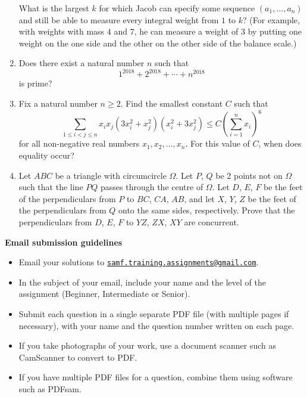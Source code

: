 \documentclass{article}
\begin{document}
\begin{enumerate}[1.]
What is the largest $k$ for which Jacob can specify some sequence $(a_1, \dotsc, a_n)$ and still be able to measure every integral weight from $1$ to $k$? (For example, with weights with mass $4$ and $7$, he can measure a weight of $3$ by putting one weight on the one side and the other on the other side of the balance scale.)


\vspace{6pt}
\item
Does there exist a natural number $n$ such that
\[
	1^{2018} + 2^{2018} + \cdots + n^{2018}
\]
is prime?


\vspace{6pt}
\item %
Fix a natural number $n \geq 2$. Find the smallest constant $C$ such that
\[
	 \sum_{1 \leq i < j \leq n} x_i x_j (3x_i^2 + x_j^2)(x_i^2 + 3x_j^2) \leq C {\left( \sum_{i = 1}^{n} x_i \right)}^6
\]
for all non-negative real numbers $x_1, x_2, \dots, x_n$. For this value of $C$, when does equality occur?


\item Let $ABC$ be a triangle with circumcircle $\Omega$. Let $P$, $Q$ be 2 points not on $\Omega$ such that the line $PQ$ passes through the centre of $\Omega$. Let $D$, $E$, $F$ be the feet of the perpendiculars from $P$ to $BC$, $CA$, $AB$, and let $X$, $Y$, $Z$ be the feet of the perpendiculars from $Q$ onto the same sides, respectively. Prove that the perpendiculars from $D$, $E$, $F$ to $YZ$, $ZX$, $XY$ are concurrent.

\end{enumerate}


\vfill
\textbf{\Large Email submission guidelines}
\begin{itemize}
	\item Email your solutions to \href{mailto:samf.training.assignments@gmail.com}{\texttt{samf.training.assignments@gmail.com}}.
	\item In the subject of your email, include your name and the level of the assignment (Beginner, Intermediate or Senior).
	\item Submit each question in a single separate PDF file (with multiple pages if necessary), with your name and the question number written on each page.
	\item If you take photographs of your work, use a document scanner such as CamScanner to convert to PDF.
	\item If you have multiple PDF files for a question, combine them using software such as PDFsam.
\end{itemize}
\end{document}
